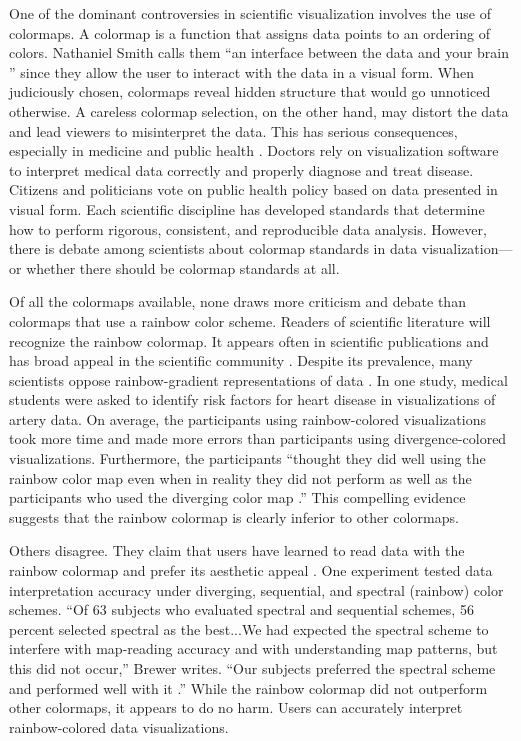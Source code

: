 \documentclass[journal,12pt]{IEEEtran}
\begin{document}
One of the dominant controversies in scientific visualization involves the use of colormaps.
A colormap is a function that assigns data points to
an ordering of colors. Nathaniel Smith
calls them ``an interface between the data and your
brain \cite{viridis}'' since they allow the user to interact with the data in a visual form.
When judiciously chosen, colormaps reveal hidden structure that would go unnoticed
otherwise. A careless colormap selection, on the other hand, may distort the data and
lead viewers to misinterpret the data. This has
serious consequences, especially in medicine and public health \cite{arteryvis,choropleth}.
Doctors rely on visualization software to interpret medical
data correctly and properly diagnose and treat disease.
Citizens and politicians vote on public health policy based on data presented 
in visual form. Each scientific discipline has developed standards that determine
how to perform rigorous, consistent, and reproducible data analysis. However,
there is debate among scientists about colormap standards in data visualization---or
whether there should be colormap standards at all.

Of all the colormaps available, none draws more criticism and debate than colormaps that use a rainbow
color scheme. Readers of scientific literature will recognize the rainbow colormap. 
It appears often in scientific publications and has 
broad appeal in the scientific community
\cite{endofrainbow, rainbowstill, spectralschemes,choropleth}.
Despite its prevalence, 
many scientists oppose rainbow-gradient representations of data
\cite{rainbowstill, endofrainbow, viridis,arteryvis}.
In one study, medical students were
asked to identify risk factors for heart disease in visualizations
of artery data. On average, the participants
using rainbow-colored visualizations took more time
and made more errors than participants using divergence-colored visualizations. 
Furthermore, the participants ``thought they did well using the rainbow color
map even when in reality they did not perform as well
as the participants who used the diverging color map
\cite{arteryvis}.'' This compelling evidence suggests
that the rainbow colormap is clearly inferior to other
colormaps.

Others disagree. They claim that users have learned to
read data with the rainbow colormap and prefer its
aesthetic appeal \cite{spectralschemes, choropleth}. One
experiment tested data interpretation accuracy under
diverging, sequential, and spectral (rainbow) color
schemes. ``Of 63 subjects who evaluated spectral and
sequential schemes, 56 percent selected spectral as the
best...We had expected the spectral scheme to interfere
with map-reading accuracy and with understanding
map patterns, but this did not occur,'' Brewer writes.
``Our subjects preferred the spectral scheme
and performed well with it \cite{spectralschemes}.''
While the rainbow colormap did not outperform other colormaps, it
appears to do no harm. Users can accurately interpret
rainbow-colored data visualizations.
\end{document}
